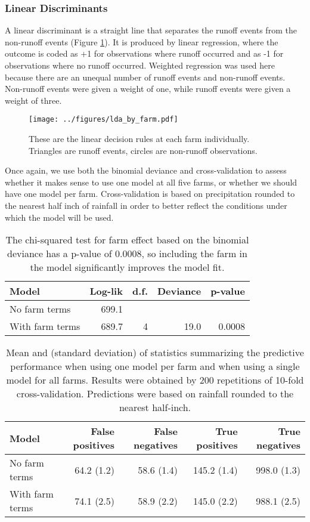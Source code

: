 \documentclass[11pt]{article}
\begin{document}
\subsubsection{Linear Discriminants}
A linear discriminant is a straight line that separates the runoff events from the non-runoff events (Figure  \ref{lda_by_farm}). It is produced by linear regression, where the outcome is coded as +1 for observations where runoff occurred and as -1 for observations where no runoff occurred. Weighted regression was used here because there are an unequal number of runoff events and non-runoff events. Non-runoff events were given a weight of one, while runoff events were given a weight of three.\*

\begin{figure}[h!]
\linespread{1}
\centering
\texttt{[image: ../figures/lda\_by\_farm.pdf]}
\caption{These are the linear decision rules at each farm individually. Triangles are runoff events, circles are non-runoff observations.\label{lda_by_farm}}
\linespread{2}
\end{figure}

Once again, we use both the binomial deviance and cross-validation to assess whether it makes sense to use one model at all five farms, or whether we should have one model per farm. Cross-validation is based on precipitation rounded to the nearest half inch of rainfall in order to better reflect the conditions under which the model will be used.\*

\begin{table}[h!]
	\centering
	\linespread{1}
	\begin{tabular}{l r r r r}
		Model & Log-lik & d.f. & Deviance & p-value \\
		\hline 
		No farm terms & 699.1 & & & \\
		With farm terms & 689.7 & 4 & 19.0 & 0.0008 \\
	\end{tabular}
	\caption{The chi-squared test for farm effect based on the binomial deviance has a p-value of 0.0008, so including the farm in the model significantly improves the model fit. \label{breakpoint_test_precip}}
	\linespread{2}
\end{table}


\begin{table}[h!]
\centering
	\linespread{1}
	\begin{tabular}{l r r r r}
		Model & False positives & False negatives & True positives & True negatives \\
		\hline 
		No farm terms & 64.2 (1.2) & 58.6 (1.4) & 145.2 (1.4) & 998.0 (1.3) \\
		With farm terms & 74.1 (2.5) & 58.9 (2.2) & 145.0 (2.2) & 988.1 (2.5) \\
	\end{tabular}
	\caption{Mean and (standard deviation) of statistics summarizing the predictive performance when using one model per farm and when using a single model for all farms. Results were obtained by 200 repetitions of 10-fold cross-validation. Predictions were based on rainfall rounded to the nearest half-inch. \label{CV}}
	\linespread{2}
\end{table}
\end{document}
